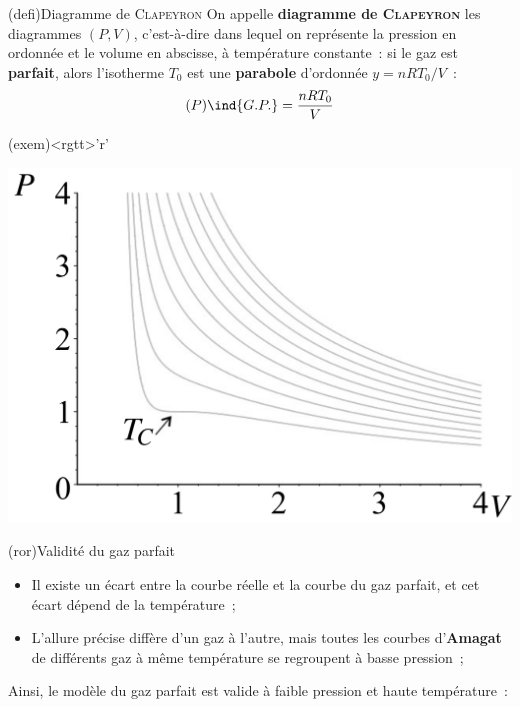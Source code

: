 \documentclass[../../main/main.tex]{subfiles}
\begin{document}
\begin{tcbraster}[raster equal height=rows, raster columns=3]
	\begin{tcb*}[raster multicolumn=2](defi){Diagramme de \textsc{Clapeyron}}
		On appelle \textbf{diagramme de \textsc{Clapeyron}} les diagrammes $(P,V)$,
		c'est-à-dire dans lequel on représente la pression en ordonnée et le volume en
		abscisse, à température constante~: si le gaz est \textbf{parfait}, alors
		l'isotherme $T_0$ est une \textbf{parabole} d'ordonnée $y = nRT_0/V$~:
		\[
			(P)\ind{G.P.} = \frac{nRT_0}{V}
		\]
	\end{tcb*}
	\begin{tcb}(exem)<rgtt>'r'{}
		\begin{center}
			\includegraphics[width=\linewidth]{clap_intro}
			\captionsetup{justification=centering}
		\end{center}
	\end{tcb}
\end{tcbraster}

\begin{tcb*}(ror){Validité du gaz parfait}
	\begin{itemize}
		\item Il existe un écart entre la courbe réelle et la courbe du gaz parfait,
		      et cet écart dépend de la température~;

		\item L'allure précise diffère d'un gaz à l'autre, mais toutes les courbes
		      d'\textbf{Amagat} de différents gaz à même température se regroupent à
		      basse pression~;
	\end{itemize}
	\bigbreak
	Ainsi, le modèle du gaz parfait est valide à faible pression et haute
	température~:
	\vspace{-15pt}
\end{tcb*}
\end{document}
